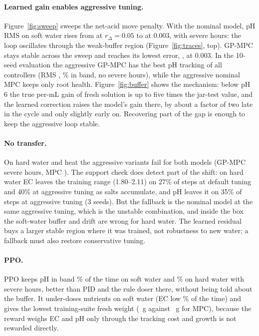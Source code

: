 \documentclass[11pt]{article}
\begin{document}
\paragraph{Learned gain enables aggressive tuning.} Figure~\ref{fig:sweep} sweeps the net-acid move penalty. With the nominal model, pH RMS on soft water rises from \nSwMpcTrRmsD{} at $r_\Delta = 0.05$ to \nSwMpcTrRmsA{} at 0.003, with \nSwMpcTrSevA{} severe hours: the loop oscillates through the weak-buffer region (Figure~\ref{fig:traces}, top). GP-MPC stays stable across the sweep and reaches its lowest error, \nSwGpTrRmsA{}, at 0.003. In the 10-seed evaluation the aggressive GP-MPC has the best pH tracking of all controllers (RMS \nGpTTrRms, \nGpTTrBand\% in band, no severe hours), while the aggressive nominal MPC keeps only \nMpcTTrRoot{} root health. Figure~\ref{fig:buffer} shows the mechanism: below pH 6 the true per-mL gain of fresh solution is up to five times the jar-test value, and the learned correction raises the model's gain there, by about a factor of two late in the cycle and only slightly early on. Recovering part of the gap is enough to keep the aggressive loop stable.

\paragraph{No transfer.} On hard water and heat the aggressive variants fail for both models (GP-MPC \nGpTUnSevere{} severe hours, MPC \nMpcTUnSevere{}). The support check does detect part of the shift: on hard water EC leaves the training range (1.80--2.11) on 27\% of steps at default tuning and 40\% at aggressive tuning as salts accumulate, and pH leaves it on 35\% of steps at aggressive tuning (3 seeds). But the fallback is the nominal model at the same aggressive tuning, which is the unstable combination, and inside the box the soft-water buffer and drift are wrong for hard water. The learned residual buys a larger stable region where it was trained, not robustness to new water; a fallback must also restore conservative tuning.

\paragraph{PPO.} PPO keeps pH in band \nPpoTrBand\% of the time on soft water and \nPpoUnBand\% on hard water with \nPpoUnSevere{} severe hours, better than PID and the rule doser there, without being told about the buffer. It under-doses nutrients on soft water (EC low \nPpoTrEcLow\% of the time) and gives the lowest training-suite fresh weight (\nPpoTrFw{}~g against \nMpcTrFw{}~g for MPC), because the reward weighs EC and pH only through the tracking cost and growth is not rewarded directly.
\end{document}

